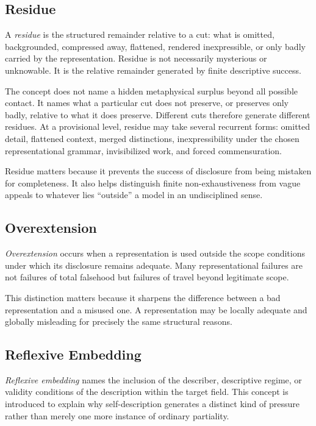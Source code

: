 \documentclass[11pt]{article}
\renewcommand{\emph}[1]{\textit{#1}}
\begin{document}
\subsection{Residue}

A \emph{residue} is the structured remainder relative to a cut: what is omitted, backgrounded, compressed away, flattened, rendered inexpressible, or only badly carried by the representation. Residue is not necessarily mysterious or unknowable. It is the relative remainder generated by finite descriptive success.

The concept does not name a hidden metaphysical surplus beyond all possible contact. It names what a particular cut does not preserve, or preserves only badly, relative to what it does preserve. Different cuts therefore generate different residues. At a provisional level, residue may take several recurrent forms: omitted detail, flattened context, merged distinctions, inexpressibility under the chosen representational grammar, invisibilized work, and forced commensuration. \cite{espeland_stevens_quantification,merry_seductions_of_quantification,star_ethnography_of_infrastructure,bowker_star_sorting_things_out}

Residue matters because it prevents the success of disclosure from being mistaken for completeness. It also helps distinguish finite non-exhaustiveness from vague appeals to whatever lies ``outside'' a model in an undisciplined sense.

\subsection{Overextension}

\emph{Overextension} occurs when a representation is used outside the scope conditions under which its disclosure remains adequate. Many representational failures are not failures of total falsehood but failures of travel beyond legitimate scope.

This distinction matters because it sharpens the difference between a bad representation and a misused one. A representation may be locally adequate and globally misleading for precisely the same structural reasons. \cite{mitchell_model_cards,gebru_datasheets,nist_explainable_ai}

\subsection{Reflexive Embedding}

\emph{Reflexive embedding} names the inclusion of the describer, descriptive regime, or validity conditions of the description within the target field. This concept is introduced to explain why self-description generates a distinct kind of pressure rather than merely one more instance of ordinary partiality.
\end{document}
